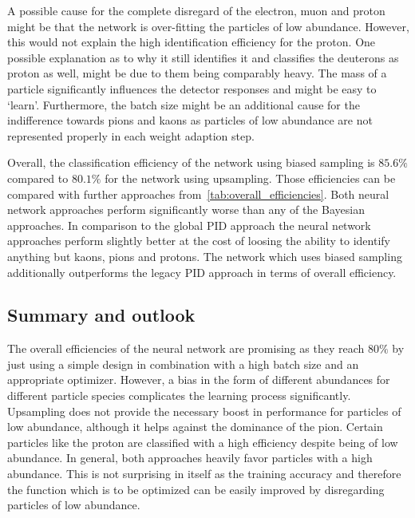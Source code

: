 A possible cause for the complete disregard of the electron, muon and proton might be that the network is over-fitting the particles of low abundance. However, this would not explain the high identification efficiency for the proton. One possible explanation as to why it still identifies it and classifies the deuterons as proton as well, might be due to them being comparably heavy. The mass of a particle significantly influences the detector responses and might be easy to `learn'.
Furthermore, the batch size might be an additional cause for the indifference towards pions and kaons as particles of low abundance are not represented properly in each weight adaption step.

Overall, the classification efficiency of the network using biased sampling is $85.6 \%$ compared to $80.1 \%$ for the network using upsampling. Those efficiencies can be compared with further approaches from~\autoref{tab:overall_efficiencies}. Both neural network approaches perform significantly worse than any of the Bayesian approaches. In comparison to the global PID approach the neural network approaches perform slightly better at the cost of loosing the ability to identify anything but kaons, pions and protons. The network which uses biased sampling additionally outperforms the legacy PID approach in terms of overall efficiency.

\subsection{Summary and outlook}
\label{subsc:neural_network_summary}

The overall efficiencies of the neural network are promising as they reach $80 \%$ by just using a simple design in combination with a high batch size and an appropriate optimizer. However, a bias in the form of different abundances for different particle species complicates the learning process significantly. Upsampling does not provide the necessary boost in performance for particles of low abundance, although it helps against the dominance of the pion. Certain particles like the proton are classified with a high efficiency despite being of low abundance. In general, both approaches heavily favor particles with a high abundance. This is not surprising in itself as the training accuracy and therefore the function which is to be optimized can be easily improved by disregarding particles of low abundance.

